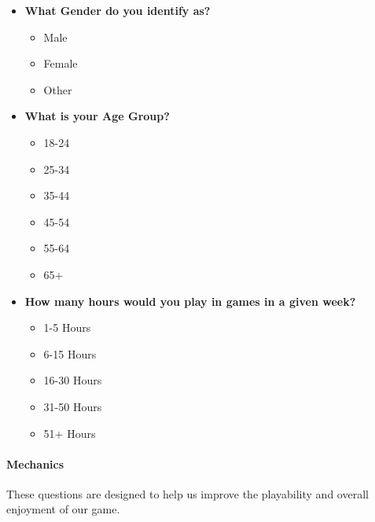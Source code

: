 \documentclass[
  letterpaper,
  DIV=11,
  numbers=noendperiod]{scrartcl}
\let\oldparagraph\paragraph
\renewcommand{\paragraph}[1]{\oldparagraph{#1}\mbox{}}
\providecommand{\tightlist}{%
  \setlength{\itemsep}{0pt}\setlength{\parskip}{0pt}}\usepackage{longtable,booktabs,array}
\begin{document}
\begin{itemize}
\item
  \textbf{What Gender do you identify as?}

  \begin{itemize}
  \tightlist
  \item
    Male
  \item
    Female
  \item
    Other
  \end{itemize}
\item
  \textbf{What is your Age Group?}

  \begin{itemize}
  \tightlist
  \item
    18-24
  \item
    25-34
  \item
    35-44
  \item
    45-54
  \item
    55-64
  \item
    65+
  \end{itemize}
\item
  \textbf{How many hours would you play in games in a given week?}

  \begin{itemize}
  \tightlist
  \item
    1-5 Hours
  \item
    6-15 Hours
  \item
    16-30 Hours
  \item
    31-50 Hours
  \item
    51+ Hours
  \end{itemize}
\end{itemize}

\paragraph{Mechanics}\label{mechanics}

These questions are designed to help us improve the playability and
overall enjoyment of our game.
\end{document}
